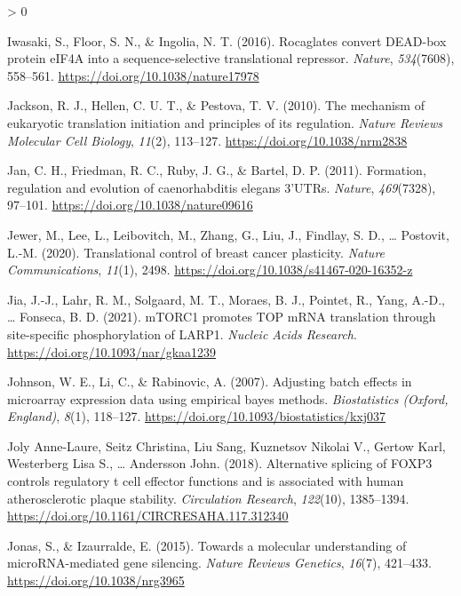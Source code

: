 \documentclass[
  12pt,
  openany]{book}
\newlength{\cslhangindent}
\newenvironment{CSLReferences}[2] %
 {%
  \setlength{\parindent}{0pt}
  \ifodd #1 \everypar{\setlength{\hangindent}{\cslhangindent}}\ignorespaces\fi
  \ifnum #2 > 0
  \setlength{\parskip}{#2\baselineskip}
  \fi
 }%
 {}
\begin{document}
\begin{CSLReferences}{1}{0}
\leavevmode\hypertarget{ref-Iwasaki2016}{}%
Iwasaki, S., Floor, S. N., \& Ingolia, N. T. (2016). Rocaglates convert {DEAD}-box protein {eIF}4A into a sequence-selective translational repressor. \emph{Nature}, \emph{534}(7608), 558--561. \url{https://doi.org/10.1038/nature17978}

\leavevmode\hypertarget{ref-Jackson2010}{}%
Jackson, R. J., Hellen, C. U. T., \& Pestova, T. V. (2010). The mechanism of eukaryotic translation initiation and principles of its regulation. \emph{Nature Reviews Molecular Cell Biology}, \emph{11}(2), 113--127. \url{https://doi.org/10.1038/nrm2838}

\leavevmode\hypertarget{ref-Jan2011}{}%
Jan, C. H., Friedman, R. C., Ruby, J. G., \& Bartel, D. P. (2011). Formation, regulation and evolution of caenorhabditis elegans 3'{UTRs}. \emph{Nature}, \emph{469}(7328), 97--101. \url{https://doi.org/10.1038/nature09616}

\leavevmode\hypertarget{ref-Jewer2020}{}%
Jewer, M., Lee, L., Leibovitch, M., Zhang, G., Liu, J., Findlay, S. D., \ldots{} Postovit, L.-M. (2020). Translational control of breast cancer plasticity. \emph{Nature Communications}, \emph{11}(1), 2498. \url{https://doi.org/10.1038/s41467-020-16352-z}

\leavevmode\hypertarget{ref-Jia2021}{}%
Jia, J.-J., Lahr, R. M., Solgaard, M. T., Moraes, B. J., Pointet, R., Yang, A.-D., \ldots{} Fonseca, B. D. (2021). {mTORC}1 promotes {TOP} {mRNA} translation through site-specific phosphorylation of {LARP}1. \emph{Nucleic Acids Research}. \url{https://doi.org/10.1093/nar/gkaa1239}

\leavevmode\hypertarget{ref-Johnson2007}{}%
Johnson, W. E., Li, C., \& Rabinovic, A. (2007). Adjusting batch effects in microarray expression data using empirical bayes methods. \emph{Biostatistics (Oxford, England)}, \emph{8}(1), 118--127. \url{https://doi.org/10.1093/biostatistics/kxj037}

\leavevmode\hypertarget{ref-JolyAnne-Laure2018}{}%
Joly Anne-Laure, Seitz Christina, Liu Sang, Kuznetsov Nikolai V., Gertow Karl, Westerberg Lisa S., \ldots{} Andersson John. (2018). Alternative splicing of {FOXP}3 controls regulatory t cell effector functions and is associated with human atherosclerotic plaque stability. \emph{Circulation Research}, \emph{122}(10), 1385--1394. \url{https://doi.org/10.1161/CIRCRESAHA.117.312340}

\leavevmode\hypertarget{ref-Jonas2015}{}%
Jonas, S., \& Izaurralde, E. (2015). Towards a molecular understanding of {microRNA}-mediated gene silencing. \emph{Nature Reviews Genetics}, \emph{16}(7), 421--433. \url{https://doi.org/10.1038/nrg3965}


\end{CSLReferences}
\end{document}
